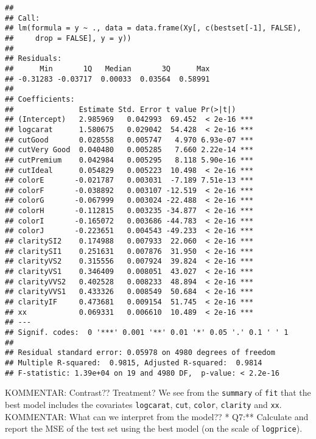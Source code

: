 \documentclass[]{article}
\newenvironment{Shaded}{\begin{snugshade}}{\end{snugshade}}
\newcommand{\KeywordTok}[1]{\textcolor[rgb]{0.13,0.29,0.53}{\textbf{#1}}}
\newcommand{\DecValTok}[1]{\textcolor[rgb]{0.00,0.00,0.81}{#1}}
\newcommand{\StringTok}[1]{\textcolor[rgb]{0.31,0.60,0.02}{#1}}
\newcommand{\OperatorTok}[1]{\textcolor[rgb]{0.81,0.36,0.00}{\textbf{#1}}}
\newcommand{\NormalTok}[1]{#1}
\begin{document}
\begin{verbatim}
## 
## Call:
## lm(formula = y ~ ., data = data.frame(Xy[, c(bestset[-1], FALSE), 
##     drop = FALSE], y = y))
## 
## Residuals:
##      Min       1Q   Median       3Q      Max 
## -0.31283 -0.03717  0.00033  0.03564  0.58991 
## 
## Coefficients:
##               Estimate Std. Error t value Pr(>|t|)    
## (Intercept)   2.985969   0.042993  69.452  < 2e-16 ***
## logcarat      1.580675   0.029042  54.428  < 2e-16 ***
## cutGood       0.028558   0.005747   4.970 6.93e-07 ***
## cutVery Good  0.040480   0.005285   7.660 2.22e-14 ***
## cutPremium    0.042984   0.005295   8.118 5.90e-16 ***
## cutIdeal      0.054829   0.005223  10.498  < 2e-16 ***
## colorE       -0.021787   0.003031  -7.189 7.51e-13 ***
## colorF       -0.038892   0.003107 -12.519  < 2e-16 ***
## colorG       -0.067999   0.003024 -22.488  < 2e-16 ***
## colorH       -0.112815   0.003235 -34.877  < 2e-16 ***
## colorI       -0.165072   0.003686 -44.783  < 2e-16 ***
## colorJ       -0.223651   0.004543 -49.233  < 2e-16 ***
## claritySI2    0.174988   0.007933  22.060  < 2e-16 ***
## claritySI1    0.251631   0.007876  31.950  < 2e-16 ***
## clarityVS2    0.315556   0.007924  39.824  < 2e-16 ***
## clarityVS1    0.346409   0.008051  43.027  < 2e-16 ***
## clarityVVS2   0.402528   0.008233  48.894  < 2e-16 ***
## clarityVVS1   0.433326   0.008549  50.684  < 2e-16 ***
## clarityIF     0.473681   0.009154  51.745  < 2e-16 ***
## xx            0.069331   0.006610  10.489  < 2e-16 ***
## ---
## Signif. codes:  0 '***' 0.001 '**' 0.01 '*' 0.05 '.' 0.1 ' ' 1
## 
## Residual standard error: 0.05978 on 4980 degrees of freedom
## Multiple R-squared:  0.9815, Adjusted R-squared:  0.9814 
## F-statistic: 1.39e+04 on 19 and 4980 DF,  p-value: < 2.2e-16
\end{verbatim}

KOMMENTAR: Contrast?? Treatment? We see from the \texttt{summary} of
\texttt{fit} that the best model includes the covariates
\texttt{logcarat}, \texttt{cut}, \texttt{color}, \texttt{clarity} and
\texttt{xx}. KOMMENTAR: What can we interpret from the model?? *\textbf{
}Q7:** Calculate and report the MSE of the test set using the best model
(on the scale of \texttt{logprice}).

\begin{Shaded}
\end{Shaded}
\end{document}
